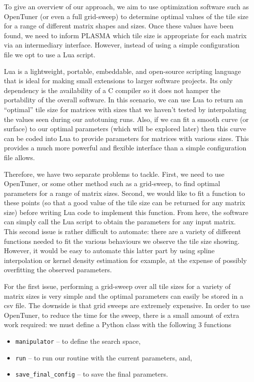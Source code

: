 \documentclass[a4paper,12pt]{article}
\begin{document}
To give an overview of our approach,
we aim to use optimization software such as OpenTuner
(or even a full grid-sweep)
to determine optimal values of the tile size for
a range of different matrix shapes and sizes.
Once these values have been found,
we need to inform PLASMA which tile size is appropriate for
each matrix via an intermediary interface.
However,
instead of using a simple configuration file
we opt to use a Lua script.

Lua is a lightweight, portable, embeddable, and open-source scripting language
that is ideal for making small extensions to larger software projects.
Its only dependency is the availability of a C compiler so it does not
hamper the portability of the overall software.
In this scenario,
we can use Lua to return an ``optimal'' tile size for matrices with
sizes that we haven't tested by interpolating the values seen
during our autotuning runs.
Also,
if we can fit a smooth curve (or surface) to our optimal parameters
(which will be explored later)
then this curve can be coded into Lua to
provide parameters for matrices with various sizes.
This provides a much more powerful and flexible interface
than a simple configuration file allows.

Therefore,
we have two separate problems to tackle.
First,
we need to use OpenTuner,
or some other method such as a grid-sweep,
to find optimal parameters for a range of matrix sizes.
Second,
we would like to fit a function to these points
(so that a good value of the tile size
can be returned for any matrix size)
before writing Lua code to implement this function.
From here,
the software can simply call the Lua script to obtain
the parameters for any input matrix.
This second issue is rather difficult to automate:
there are a variety of different functions needed to
fit the various behaviours we observe the tile size showing.
However,
it would be easy to automate this latter part by using spline
interpolation or kernel density estimation
for example,
at the expense of possibly overfitting the observed parameters.

For the first issue,
performing a grid-sweep over all tile sizes for
a variety of matrix sizes
is very simple and the optimal parameters can easily be
stored in a csv file.
The downside is that grid sweeps are extremely expensive.
In order to use OpenTuner,
to reduce the time for the sweep,
there is a small amount of extra work required:
we must define a Python class with the following 3 functions
\begin{itemize}
\item \texttt{manipulator} -- to define the search space,
\item \texttt{run} -- to run our routine with the
  current parameters, and,
\item \texttt{save\_final\_config} -- to save the final parameters.
\end{itemize}
\end{document}
